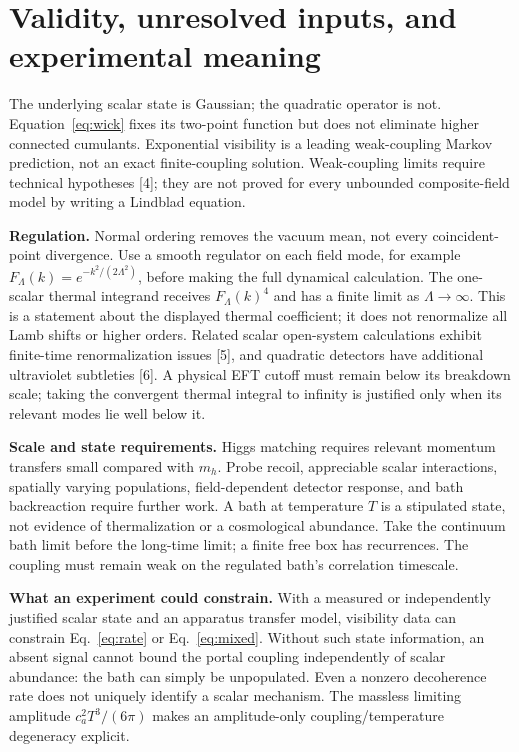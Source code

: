 \documentclass[11pt]{article}
\begin{document}
\newpage
\section{Validity, unresolved inputs, and experimental meaning}
The underlying scalar state is Gaussian; the quadratic operator is not.
Equation~\eqref{eq:wick} fixes its two-point function but does not eliminate
higher connected cumulants. Exponential visibility is a leading
weak-coupling Markov prediction, not an exact finite-coupling solution.
Weak-coupling limits require technical hypotheses [4]; they are not proved
for every unbounded composite-field model by writing a Lindblad equation.

\textbf{Regulation.} Normal ordering removes the vacuum mean, not every
coincident-point divergence. Use a smooth regulator on each field mode,
for example $F_\Lambda(k)=e^{-k^2/(2\Lambda^2)}$, before making the
full dynamical calculation. The one-scalar thermal integrand receives
$F_\Lambda(k)^4$ and has a finite limit as $\Lambda\to\infty$.
This is a statement about the displayed thermal coefficient; it does not
renormalize all Lamb shifts or higher orders. Related scalar open-system
calculations exhibit finite-time renormalization issues [5], and quadratic
detectors have additional ultraviolet subtleties [6]. A physical EFT cutoff
must remain below its breakdown scale; taking the convergent thermal
integral to infinity is justified only when its relevant modes lie well below it.

\textbf{Scale and state requirements.} Higgs matching requires relevant
momentum transfers small compared with $m_h$. Probe recoil, appreciable
scalar interactions, spatially varying populations, field-dependent
detector response, and bath backreaction require further work. A bath at
temperature $T$ is a stipulated state, not evidence of thermalization or a
cosmological abundance. Take the continuum bath limit before the long-time
limit; a finite free box has recurrences. The coupling must remain weak
on the regulated bath's correlation timescale.

\textbf{What an experiment could constrain.} With a measured or independently
justified scalar state and an apparatus transfer model, visibility data can
constrain Eq.~\eqref{eq:rate} or Eq.~\eqref{eq:mixed}. Without such state
information, an absent signal cannot bound the portal coupling independently
of scalar abundance: the bath can simply be unpopulated. Even a nonzero
decoherence rate does not uniquely identify a scalar mechanism.
The massless limiting amplitude $c_a^2T^3/(6\pi)$ makes an amplitude-only
coupling/temperature degeneracy explicit.
\end{document}
